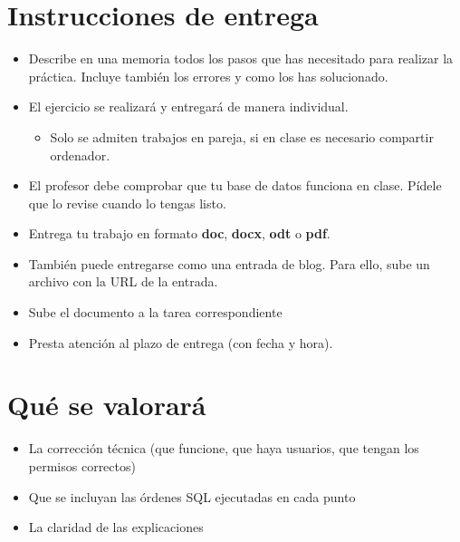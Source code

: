 \section{Instrucciones de entrega}
\begin{itemize}
\item Describe en una memoria todos los pasos que has necesitado para realizar la práctica. Incluye también los errores y como los has solucionado.
\item El ejercicio se realizará y entregará de manera individual.
  \begin{itemize}
  \item Solo se admiten trabajos en pareja, si en clase es necesario compartir ordenador.
  \end{itemize}
\item El profesor debe comprobar que tu base de datos funciona en clase. Pídele que lo revise cuando lo tengas listo.
\item Entrega tu trabajo en formato \textbf{doc}, \textbf{docx}, \textbf{odt} o \textbf{pdf}.
\item También puede entregarse como una entrada de blog. Para ello, sube un archivo con la URL de la entrada.
\item Sube el documento a la tarea correspondiente 
\item Presta atención al plazo de entrega (con fecha y hora).
\end{itemize}


\section{Qué se valorará}
\begin{itemize}
\item La corrección técnica (que funcione, que haya usuarios, que tengan los permisos correctos)
\item Que se incluyan las órdenes SQL ejecutadas en cada punto
\item La claridad de las explicaciones
\end{itemize}



